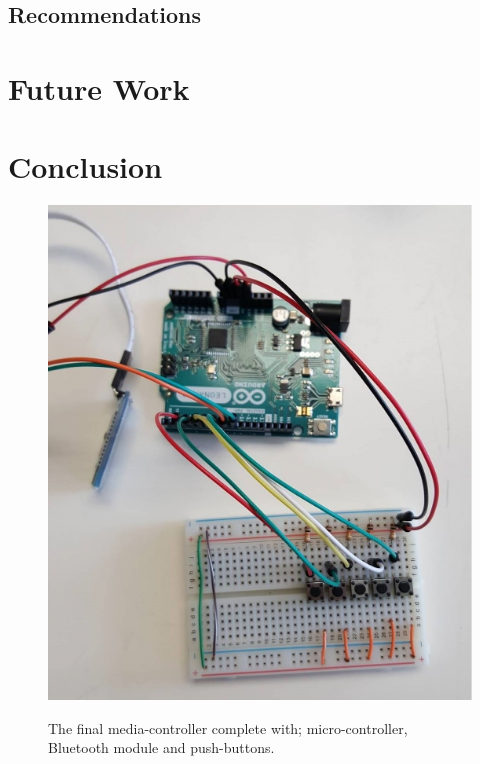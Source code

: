 \documentclass{article}
\begin{document}
		\subsection{Recommendations}
			\lipsum[1]
			
	\section{Future Work}
		\lipsum[1]
	
	\section{Conclusion}
		\lipsum[1]
				
	\begin{figure}[]
		\centering
		\label{fullSystem}
		{\includegraphics[scale = 0.5]{fullSystem}}
		\caption{The final media-controller complete with; micro-controller, Bluetooth module and push-buttons.}
	\end{figure}
	
	
\end{document}
